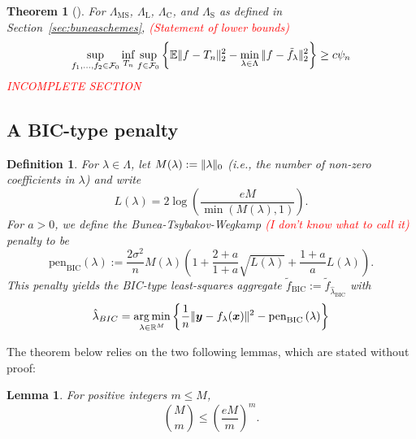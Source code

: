 \documentclass[11pt, letter paper]{article}
\newcommand{\1}{\mathmybb{1}}
\newtheorem{definition}{Definition}[section]
\newtheorem{theorem}[proposition]{Theorem}
\newtheorem{lemma}[proposition]{Lemma}
\DeclareMathOperator*{\argmin}{arg\,min}
\newcommand{\R}{\mathbb{R}}
\newcommand{\0}{\emptyset}
\newcommand{\E}{\mathbb{E}}
\newcommand{\paren}[1]{\left(#1 \right)}
\newcommand{\set}[1]{\left\{ #1 \right\}}
\newcommand{\norm}[1]{|\hspace{-1pt}|#1 |\hspace{-1pt}|}
\newcommand{\normsq}[1]{\norm{#1}^{2}}
\newcommand{\x}{\boldsymbol{x}}
\newcommand{\y}{\boldsymbol{y}}
\newcommand{\ftilde}[1]{\tilde{f}_{#1}}
\newcommand{\lambdahat}[1]{\hat{\lambda}_{#1}}
\newcommand{\penBIC}[1]{\mathrm{pen}_{\mathrm{BIC}}\paren{#1}}
\begin{document}
\begin{theorem}[\cite{bunea_2007}]\label{prop:buneath5.1}
    For \(\Lambda_{\mathrm{MS}}\), \(\Lambda_{\mathrm{L}}\), \(\Lambda_{\mathrm{C}}\), and \(\Lambda_{\mathrm{S}}\) as defined in Section~\ref{sec:buneaschemes}, 
    \textcolor{red}{(Statement of lower bounds)}
    \[\sup_{f_1, \ldots, f_2\in\mathcal{F}_{0}} \inf_{T_n}\sup_{f\in\mathcal{F}_0} \set{\E\normsq{f - T_n}_{2} - \min_{\lambda\in\Lambda}\normsq{f - \ftilde{\lambda}}_{2}} \geq c\psi_{n}\]
    \textcolor{red}{INCOMPLETE SECTION}
\end{theorem}

\subsection{A BIC-type penalty}
\begin{definition}
    For \(\lambda\in\Lambda\), let \(M(\lambda) := \norm{\lambda}_{0}\) (i.e., the number of non-zero coefficients in \(\lambda\)) and write
    \[L(\lambda) = 2\log\paren{\frac{eM}{\min(M(\lambda), 1)}}.\]
    For \(a>0\), we define the Bunea-Tsybakov-Wegkamp \textcolor{red}{(I don't know what to call it)} penalty to be
    \[\penBIC{\lambda} := \frac{2\sigma^{2}}{n}M(\lambda)\paren{1+\frac{2+a}{1+a}\sqrt{L(\lambda)} + \frac{1+a}{a}{L(\lambda)}}.\]
    This penalty yields the BIC-type least-squares aggregate \(\ftilde{\mathrm{BIC}} := \ftilde{\lambdahat{\mathrm{BIC}}}\) with 
    \[\lambdahat{BIC}=\argmin_{\lambda\in\R^{M}}\set{\frac{1}{n}\normsq{\y - f_{\lambda}(\x)} - \penBIC{\lambda}}\]
\end{definition}

The theorem below relies on the two following lemmas, which are stated without proof:

\begin{lemma}\label{lemm:binombound}
    For positive integers \(m \leq M\),
    \[\binom{M}{m} \leq \paren{\frac{eM}{m}}^m.\]
\end{lemma}
\end{document}
